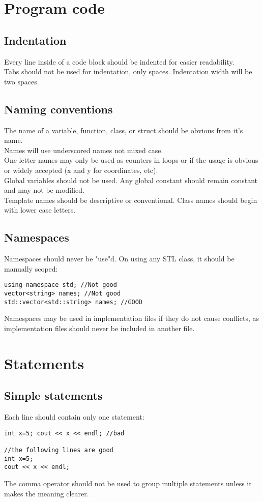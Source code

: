 \documentclass[letterpaper,10pt]{article}
\begin{document}
\section{Program code}
\subsection{Indentation}
Every line inside of a code block should be indented for easier readability.\\
Tabs should not be used for indentation, only spaces.  Indentation width will be two spaces.
\subsection{Naming conventions}
The name of a variable, function, class, or struct should be obvious from it's name.\\
Names will use underscored names not mixed case.\\
One letter names may only be used as counters in loops or if the usage is obvious or widely accepted (x and y for coordinates, etc).\\
Global variables should not be used. Any global constant should remain constant and may not be modified.\\
Template names should be descriptive or conventional.
Class names should begin with lower case letters.
\subsection{Namespaces}
Namespaces should never be "use"d.  On using any STL class, it should be manually scoped:
\begin{verbatim}
using namespace std; //Not good
vector<string> names; //Not good
std::vector<std::string> names; //GOOD
\end{verbatim}
Namespaces may be used in implementation files if they do not cause conflicts, as implementation files should never be included in another file.
\section{Statements}
\subsection{Simple statements}
Each line should contain only one statement:
\begin{verbatim}
int x=5; cout << x << endl; //bad

//the following lines are good
int x=5;
cout << x << endl;
\end{verbatim}
The comma operator should not be used to group multiple statements unless it makes the meaning clearer.
\end{document}
